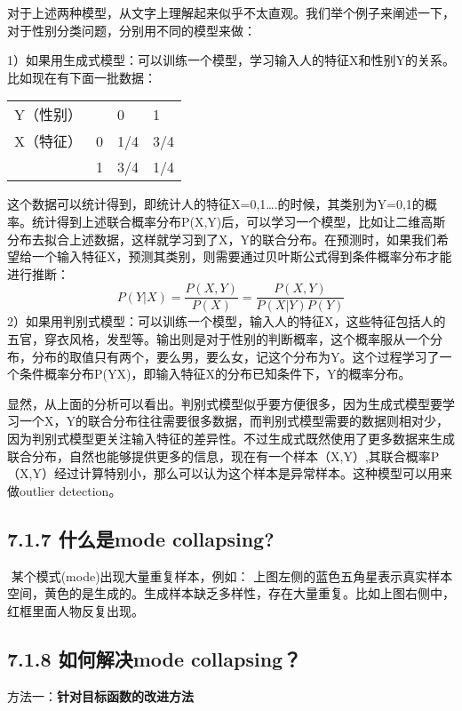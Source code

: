 ​
对于上述两种模型，从文字上理解起来似乎不太直观。我们举个例子来阐述一下，对于性别分类问题，分别用不同的模型来做：

​
1）如果用生成式模型：可以训练一个模型，学习输入人的特征X和性别Y的关系。比如现在有下面一批数据：

\begin{longtable}[]{ llll }
Y（性别） & & 0 & 1\tabularnewline
X（特征） & 0 & 1/4 & 3/4\tabularnewline
& 1 & 3/4 & 1/4\tabularnewline
\end{longtable}

​
这个数据可以统计得到，即统计人的特征X=0,1\ldots{}.的时候，其类别为Y=0,1的概率。统计得到上述联合概率分布P(X,Y)后，可以学习一个模型，比如让二维高斯分布去拟合上述数据，这样就学习到了X，Y的联合分布。在预测时，如果我们希望给一个输入特征X，预测其类别，则需要通过贝叶斯公式得到条件概率分布才能进行推断：
\[
P(Y|X)={\frac{P(X,Y)}{P(X)}}={\frac{P(X,Y)}{P(X|Y)P(Y)}}
\] ​
2）如果用判别式模型：可以训练一个模型，输入人的特征X，这些特征包括人的五官，穿衣风格，发型等。输出则是对于性别的判断概率，这个概率服从一个分布，分布的取值只有两个，要么男，要么女，记这个分布为Y。这个过程学习了一个条件概率分布P(Y\textbar{}X)，即输入特征X的分布已知条件下，Y的概率分布。

​
显然，从上面的分析可以看出。判别式模型似乎要方便很多，因为生成式模型要学习一个X，Y的联合分布往往需要很多数据，而判别式模型需要的数据则相对少，因为判别式模型更关注输入特征的差异性。不过生成式既然使用了更多数据来生成联合分布，自然也能够提供更多的信息，现在有一个样本（X,Y）,其联合概率P（X,Y）经过计算特别小，那么可以认为这个样本是异常样本。这种模型可以用来做outlier
detection。

\subsection{7.1.7 什么是mode
collapsing?}\label{ux4ec0ux4e48ux662fmode-collapsing}

​ 某个模式(mode)出现大量重复样本，例如：
上图左侧的蓝色五角星表示真实样本空间，黄色的是生成的。生成样本缺乏多样性，存在大量重复。比如上图右侧中，红框里面人物反复出现。

\subsection{7.1.8 如何解决mode
collapsing？}\label{ux5982ux4f55ux89e3ux51b3mode-collapsing}

方法一：\textbf{针对目标函数的改进方法}

